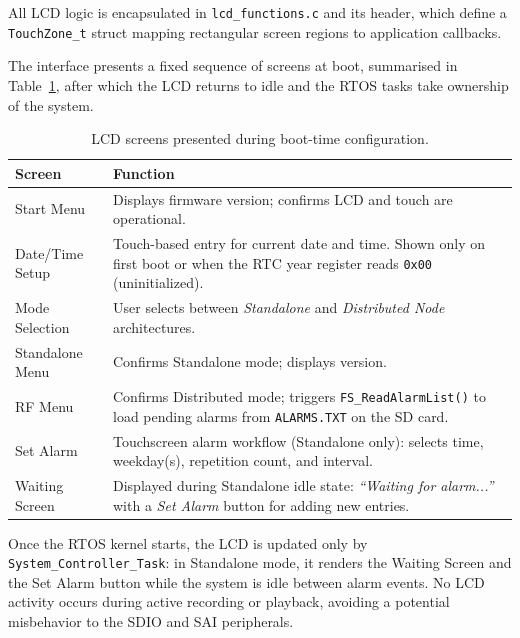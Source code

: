 All LCD logic is encapsulated in \texttt{lcd\_functions.c} and its header, which define a \texttt{TouchZone\_t} struct mapping rectangular screen regions to application callbacks.

The interface presents a fixed sequence of screens at boot, summarised in Table~\ref{tab:lcd_screens}, after which the LCD returns to idle and the RTOS tasks take ownership of the system.

\begin{table}[h!]
  \centering
  \caption{LCD screens presented during boot-time configuration.}
  \label{tab:lcd_screens}
  \begin{tabular}{|l|p{9cm}|}
    \hline
    \textbf{Screen} & \textbf{Function} \\\hline
    \hline
    Start Menu        & Displays firmware version; confirms LCD and touch are operational. \\\hline
    Date/Time Setup   & Touch-based entry for current date and time.
                        Shown only on first boot or when the RTC year register
                        reads \texttt{0x00} (uninitialized). \\\hline
    Mode Selection    & User selects between \textit{Standalone} and
                        \textit{Distributed Node} architectures. \\\hline
    Standalone Menu   & Confirms Standalone mode; displays version. \\
    RF Menu           & Confirms Distributed mode; triggers
                        \texttt{FS\_ReadAlarmList()} to load pending alarms
                        from \texttt{ALARMS.TXT} on the SD card. \\\hline
    Set Alarm         & Touchscreen alarm workflow (Standalone only): selects
                        time, weekday(s), repetition count, and interval. \\ \hline
    Waiting Screen    & Displayed during Standalone idle state:
                        \textit{``Waiting for alarm...''} with a
                        \textit{Set Alarm} button for adding new entries. \\
    \hline
  \end{tabular}
\end{table}

Once the RTOS kernel starts, the LCD is updated only by \linebreak \texttt{System\_Controller\_Task}: in Standalone mode, it renders the Waiting Screen and the Set Alarm button while the system is idle between alarm events. No LCD activity occurs during active recording or playback, avoiding a potential misbehavior to the SDIO and SAI peripherals.

